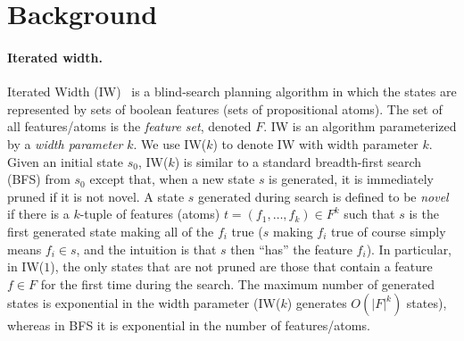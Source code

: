 \section{Background}

\paragraph{Iterated width.}
Iterated Width (IW)~\cite{iworginal} is a blind-search planning algorithm in which the states are represented by sets of boolean features (sets of propositional atoms). The set of all features/atoms is the \emph{feature set}, denoted $F$. IW is an algorithm parameterized by a \emph{width parameter} $k$. We use IW($k$) to denote IW with width parameter $k$. 
Given an initial state $s_0$, IW($k$) is similar to a standard breadth-first search (BFS) from $s_0$ except that, when a new state $s$ is generated, it is immediately pruned if it is not novel. A state $s$ generated during search is defined to be \emph{novel} if there is a $k$-tuple of features (atoms) $t = (f_1, \ldots, f_k) \in F^k$ such that $s$ is the first generated state making all of the $f_i$ true ($s$ making $f_i$ true of course simply means $f_i \in s$, and the intuition is that $s$ then ``has'' the feature $f_i$).  In particular, in IW($1$), the only states that are not pruned are those that contain a feature $f \in F$ for the first time during the search.
The maximum number of generated states is exponential in the width parameter (IW($k$) generates $O(|F|^k)$ states), whereas in BFS it is exponential in the number of features/atoms.

